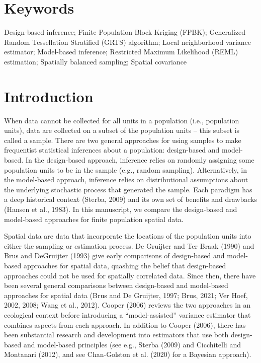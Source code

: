 \documentclass[]{elsarticle} %
\begin{document}
\hypertarget{keywords}{%
\section*{Keywords}\label{keywords}}

Design-based inference; Finite Population Block Kriging (FPBK);
Generalized Random Tessellation Stratified (GRTS) algorithm; Local
neighborhood variance estimator; Model-based inference; Restricted
Maximum Likelihood (REML) estimation; Spatially balanced sampling;
Spatial covariance

\hypertarget{sec:introduction}{%
\section{Introduction}\label{sec:introduction}}

When data cannot be collected for all units in a population (i.e.,
population units), data are collected on a subset of the population
units -- this subset is called a sample. There are two general
approaches for using samples to make frequentist statistical inferences
about a population: design-based and model-based. In the design-based
approach, inference relies on randomly assigning some population units
to be in the sample (e.g., random sampling). Alternatively, in the
model-based approach, inference relies on distributional assumptions
about the underlying stochastic process that generated the sample. Each
paradigm has a deep historical context (Sterba, 2009) and its own set of
benefits and drawbacks (Hansen et al., 1983). In this manuscript, we
compare the design-based and model-based approaches for finite
population spatial data.

Spatial data are data that incorporate the locations of the population
units into either the sampling or estimation process. De Gruijter and
Ter Braak (1990) and Brus and DeGruijter (1993) give early comparisons
of design-based and model-based approaches for spatial data, quashing
the belief that design-based approaches could not be used for spatially
correlated data. Since then, there have been several general comparisons
between design-based and model-based approaches for spatial data (Brus
and De Gruijter, 1997; Brus, 2021; Ver Hoef, 2002, 2008; Wang et al.,
2012). Cooper (2006) reviews the two approaches in an ecological context
before introducing a ``model-assisted'' variance estimator that combines
aspects from each approach. In addition to Cooper (2006), there has been
substantial research and development into estimators that use both
design-based and model-based principles (see e.g., Sterba (2009) and
Cicchitelli and Montanari (2012), and see Chan-Golston et al. (2020) for
a Bayesian approach).
\end{document}
